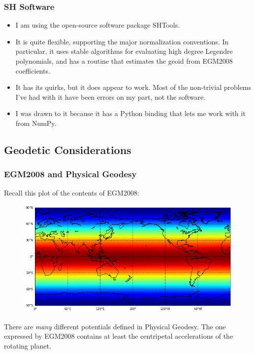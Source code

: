 \documentclass[aspectratio=43,mathserif]{beamer}
\begin{document}
\begin{frame}
\frametitle{SH Software}
\begin{itemize}
\item I am using the open-source software package SHTools. 

\item It is quite flexible, supporting the major normalization conventions. In particular, it uses stable algorithms for evaluating high degree Legendre polynomials, and has a routine that estimates the geoid from EGM2008 coefficients.

\item It has its quirks, but it does appear to work. Most of the non-trivial problems I've had with it have been errors on my part, not the software.

\item I was drawn to it because it has a Python binding that lets me work with it from NumPy.
\end{itemize}
\end{frame}

\subsection{Geodetic Considerations}
\begin{frame}
\frametitle{EGM2008 and Physical Geodesy}
Recall this plot of the contents of EGM2008:
\begin{figure}
\includegraphics[width=0.9\linewidth]{EGM08Raw.png}
\end{figure}
There are \emph{many} different potentials defined in Physical Geodesy. The one expressed by EGM2008 contains at least the centripetal accelerations of the rotating planet.
\end{frame}
\end{document}
